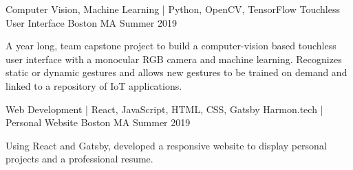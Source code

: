 

\begin{cventries}
  \cventry
    {Computer Vision, Machine Learning | Python, OpenCV, TensorFlow} %
    {Touchless User Interface} %
    {Boston MA} %
    {Summer 2019} %
    {
      \begin{cvitems} %
        \item {A year long, team capstone project to build a computer-vision based touchless user interface with a monocular RGB camera and machine learning. Recognizes static or dynamic gestures and allows new gestures to be trained on demand and linked to a repository of IoT applications.}
      \end{cvitems}
    }

  \cventry
    {Web Development | React, JavaScript, HTML, CSS, Gatsby} %
    {Harmon.tech | Personal Website} %
    {Boston MA} %
    {Summer 2019} %
    {
      \begin{cvitems} %
        \item {Using React and Gatsby, developed a responsive website to display personal projects and a professional resume.}
      \end{cvitems}
    }

\end{cventries}
